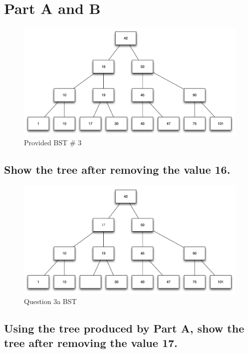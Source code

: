 \documentclass[letter,11pt]{scrartcl}
\begin{document}

\section{Part A and B}

\begin{figure}[H]
  \centering
  \includegraphics[width=1.0\textwidth]{bst_3}
  \caption{Provided BST \# 3}
\end{figure}

\subsection{Show the tree after removing the value 16.}

\begin{figure}[H]
  \centering
  \includegraphics[width=1.0\textwidth]{bst_3a}
  \caption{Question 3a BST}
\end{figure}

\subsection{Using the tree produced by Part A, show the tree after removing
  the value 17.}
\end{document}
